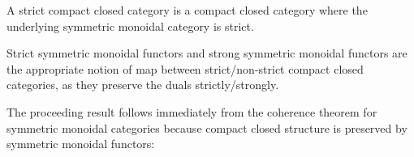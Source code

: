 \begin{definition}
\begin{description}
\hspace*{-1.1cm}



\end{description}

A strict compact closed category is a compact closed category where the underlying symmetric monoidal category is strict.

Strict symmetric monoidal functors and strong symmetric monoidal functors are the appropriate notion of map between strict/non-strict compact closed categories, as they preserve the duals strictly/strongly.
\end{definition}


The proceeding result follows immediately from the coherence theorem for symmetric monoidal categories because compact closed structure is preserved by symmetric monoidal functors:

